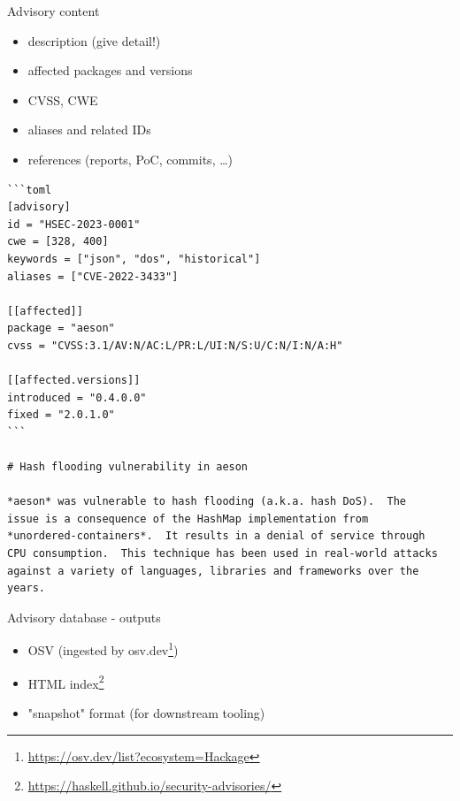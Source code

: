 \documentclass[ignorenonframetext,aspectratio=169,12pt]{beamer}
\begin{document}
\begin{frame}{Advisory content}
  \begin{itemize}
    \item description (give detail!)
    \item affected packages and versions
    \item CVSS, CWE
    \item aliases and related IDs
    \item references (reports, PoC, commits, \ldots{})
  \end{itemize}
\end{frame}


\begin{frame}[fragile]
\scriptsize
\begin{verbatim}
```toml
[advisory]
id = "HSEC-2023-0001"
cwe = [328, 400]
keywords = ["json", "dos", "historical"]
aliases = ["CVE-2022-3433"]

[[affected]]
package = "aeson"
cvss = "CVSS:3.1/AV:N/AC:L/PR:L/UI:N/S:U/C:N/I:N/A:H"

[[affected.versions]]
introduced = "0.4.0.0"
fixed = "2.0.1.0"
```

# Hash flooding vulnerability in aeson

*aeson* was vulnerable to hash flooding (a.k.a. hash DoS).  The
issue is a consequence of the HashMap implementation from
*unordered-containers*.  It results in a denial of service through
CPU consumption.  This technique has been used in real-world attacks
against a variety of languages, libraries and frameworks over the
years.

\end{verbatim}
\end{frame}

\begin{frame}{Advisory database - outputs}
  \begin{itemize}
    \item OSV (ingested by
      osv.dev\footnote{\url{https://osv.dev/list?ecosystem=Hackage}})
    \item HTML index\footnote{\url{https://haskell.github.io/security-advisories/}}
    \item "snapshot" format (for downstream tooling)
  \end{itemize}
\end{frame}
\end{document}

